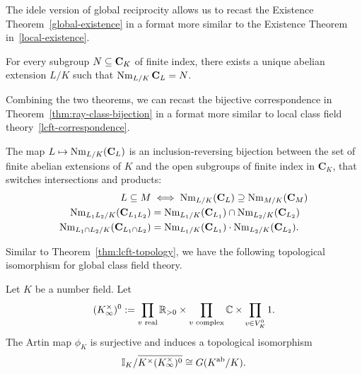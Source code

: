 The idele version of global reciprocity allows us to recast the Existence Theorem~\ref{global-existence} in a format more similar to the Existence Theorem in~\ref{local-existence}.
\begin{thm}
For every subgroup $N\subseteq \mathbf C_K$ of finite index, there exists a unique abelian extension $L/K$ such that $\operatorname{Nm}_{L/K} \mathbf C_L=N$.
\end{thm}
Combining the two theorems, we can recast the bijective correspondence in Theorem~\ref{thm:ray-class-bijection} in a format more similar to local class field theory~\ref{lcft-correspondence}.
\begin{thm}
The map $L\mapsto \operatorname{Nm}_{L/K}(\mathbf C_L)$ is an inclusion-reversing bijection between the set of finite abelian extensions of $K$ and the open subgroups of finite index in $\mathbf C_K$, that switches intersections and products:
\begin{align*}
L\subeq M&\iff \nm_{L/K}(\mathbf C_L)\supeq \nm_{M/K}(\mathbf C_M)\\%
\nm_{L_1L_2/K}(\mathbf C_{L_1 L_2})&=\nm_{L_1/K}(\mathbf C_{L_1})\cap \nm_{L_2/K}(\mathbf C_{L_2})\\%
\nm_{L_1\cap L_2/K}(\mathbf C_{L_1\cap L_2})&=\nm_{L_1/K}(\mathbf C_{L_1})\cdot \nm_{L_2/K}(\mathbf C_{L_2}).
\end{align*}
\end{thm}
Similar to Theorem~\ref{thm:lcft-topology}, we have the following topological isomorphism for global class field theory.
\begin{thm}
Let $K$ be a number field. Let
\[
(K_\infty^{\times})^0:=\prod_{v\text{ real}}\mathbb{R}_{>0}\times \prod_{v\text{ complex}}\mathbb{C}\times \prod_{v\in V_K^0} 1.
\]
The Artin map $\phi_K$ is surjective
and induces a topological isomorphism %
\[
\mathbb{I}_K/\overline{K^{\times}(K^{\times}_{\infty})^0}\cong G(K^{\text{ab}}/K).
\]
\end{thm}
